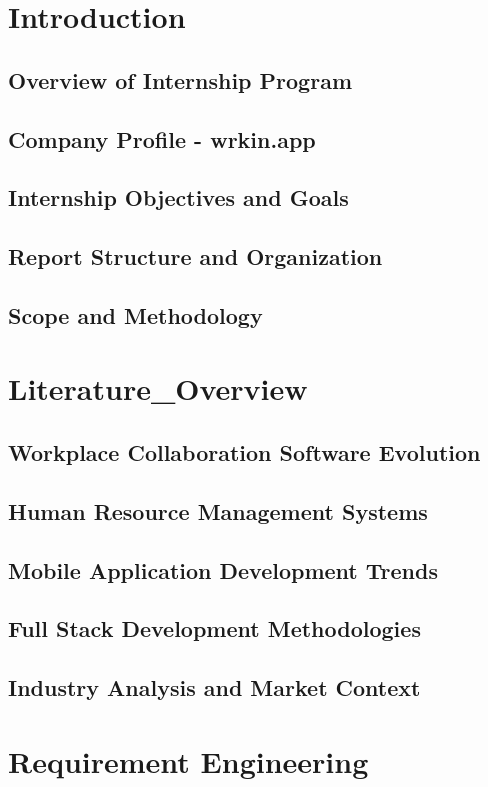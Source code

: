 \documentclass[a4paper, 11pt, oneside]{report}
\begin{document}
\chapter{Introduction}
  \section{Overview of Internship Program}
  \section{Company Profile - wrkin.app}
  \section{Internship Objectives and Goals}
  \section{Report Structure and Organization}
  \section{Scope and Methodology}
  

\chapter{Literature_Overview}
  \section{Workplace Collaboration Software Evolution}
  \section{Human Resource Management Systems}
  \section{Mobile Application Development Trends}
  \section{Full Stack Development Methodologies}
  \section{Industry Analysis and Market Context}
  

\chapter{Requirement Engineering}
\end{document}
